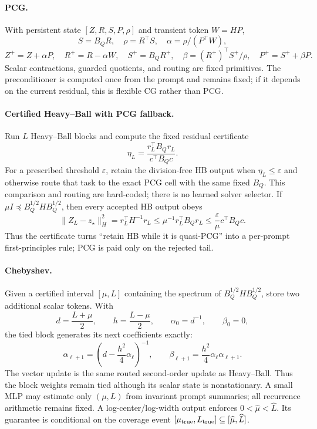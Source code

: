 \documentclass[11pt]{article}
\begin{document}
\paragraph{PCG.}
With persistent state $[Z,R,S,P,\rho]$ and transient token $W=HP$,
\[
 S=B_QR,\quad \rho=R^\top S,\quad
 \alpha=\rho/(P^\top W),
\]
\[
 Z^+=Z+\alpha P,\quad R^+=R-\alpha W,\quad
 S^+=B_QR^+,\quad
 \beta=(R^+)^\top S^+/\rho,\quad P^+=S^++\beta P.
\]
Scalar contractions, guarded quotients, and routing are fixed primitives.
The preconditioner is computed once from the prompt and remains fixed; if it
depends on the current residual, this is flexible CG rather than PCG.

\paragraph{Certified Heavy--Ball with PCG fallback.}
Run $L$ Heavy--Ball blocks and compute the fixed residual certificate
\[
 \eta_L=\frac{r_L^\top B_Qr_L}{c^\top B_Qc}.
\]
For a prescribed threshold $\varepsilon$, retain the division-free HB output
when $\eta_L\leq\varepsilon$ and otherwise route that task to the exact PCG
cell with the same fixed $B_Q$.  This comparison and routing are hard-coded;
there is no learned solver selector.  If
$\mu I\preceq B_Q^{1/2}HB_Q^{1/2}$, then every accepted HB output obeys
\[
 \|Z_L-z_\star\|_H^2
 =r_L^\top H^{-1}r_L
 \leq \mu^{-1}r_L^\top B_Qr_L
 \leq \frac{\varepsilon}{\mu}c^\top B_Qc.
\]
Thus the certificate turns ``retain HB while it is quasi-PCG'' into a
per-prompt first-principles rule; PCG is paid only on the rejected tail.

\paragraph{Chebyshev.}
Given a certified interval $[\mu,L]$ containing the spectrum of
$B_Q^{1/2}HB_Q^{1/2}$, store two additional scalar tokens.  With
\[
 d=\frac{L+\mu}{2},\qquad h=\frac{L-\mu}{2},\qquad
 \alpha_0=d^{-1},\qquad \beta_0=0,
\]
the tied block generates its next coefficients exactly:
\[
 \alpha_{\ell+1}
 =\left(d-\frac{h^2}{4}\alpha_\ell\right)^{-1},
 \qquad
 \beta_{\ell+1}=\frac{h^2}{4}\alpha_\ell\alpha_{\ell+1}.
\]
The vector update is the same routed second-order update as Heavy--Ball.  Thus
the block weights remain tied although its scalar state is nonstationary.  A
small MLP may estimate only $(\mu,L)$ from invariant prompt summaries; all
recurrence arithmetic remains fixed.  A log-center/log-width output enforces
$0<\widehat\mu<\widehat L$.  Its guarantee is conditional on the coverage
event $[\mu_{\rm true},L_{\rm true}]\subseteq
[\widehat\mu,\widehat L]$.
\end{document}
